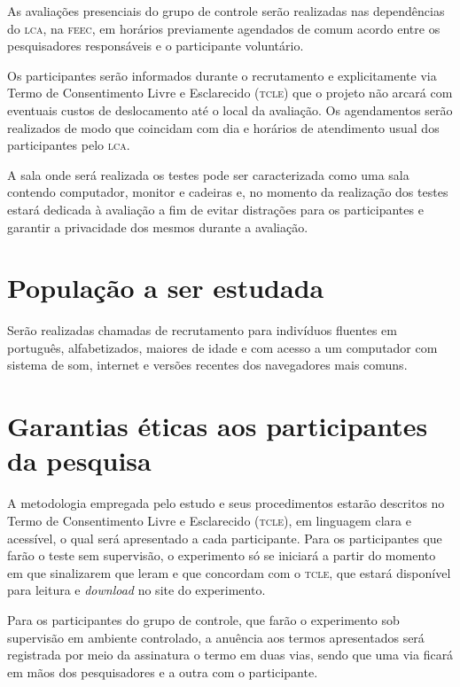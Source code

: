 \documentclass[a4paper,11pt,titlepage,singlespacing]{article}
\begin{document}
As avaliações presenciais do grupo de controle serão realizadas nas dependências do \textsc{lca}, na \textsc{feec}, em horários previamente agendados de comum acordo entre os pesquisadores responsáveis e o participante voluntário.

Os participantes serão informados durante o recrutamento e explicitamente via Termo de Consentimento Livre e Esclarecido (\textsc{tcle}) que o projeto não arcará com eventuais custos de deslocamento até o local da avaliação. Os agendamentos serão realizados de modo que coincidam com dia e horários de atendimento usual dos participantes pelo \textsc{lca}.

A sala onde será realizada os testes pode ser caracterizada como uma sala contendo computador, monitor e cadeiras e, no momento da realização dos testes estará dedicada à avaliação a fim de evitar distrações para os participantes e garantir a privacidade dos mesmos durante a avaliação.

\section{População a ser estudada}

\noindent Serão realizadas chamadas de recrutamento para indivíduos fluentes em português, alfabetizados, maiores de idade e com acesso a um computador com sistema de som, internet e versões recentes dos navegadores mais comuns.

\section{Garantias éticas aos participantes da pesquisa}
\noindent A metodologia empregada pelo estudo e seus procedimentos estarão descritos no Termo de Consentimento Livre e Esclarecido (\textsc{tcle}), em linguagem clara e acessível, o qual será apresentado a cada participante. Para os participantes que farão o teste sem supervisão, o experimento só se iniciará a partir do momento em que sinalizarem que leram e que concordam com o \textsc{tcle}, que estará disponível para leitura e \textit{download} no site do experimento. 

Para os participantes do grupo de controle, que farão o experimento sob supervisão em ambiente controlado, a anuência aos termos apresentados será registrada por meio da assinatura o termo em duas vias, sendo que uma via ficará em mãos dos pesquisadores e a outra com o participante.

\end{document}
